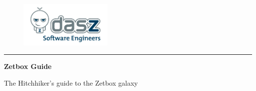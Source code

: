 \begin{figure}
	\includegraphics[width=0.4\textwidth]{images/logo.jpg}
\end{figure}
\hrule

\vspace*{1.5cm}

\begin{center}
 {\huge \bf Zetbox Guide }
\end{center}

\vspace*{1cm}

\begin{center}
{\huge The Hitchhiker's guide to the Zetbox galaxy }
\end{center}


